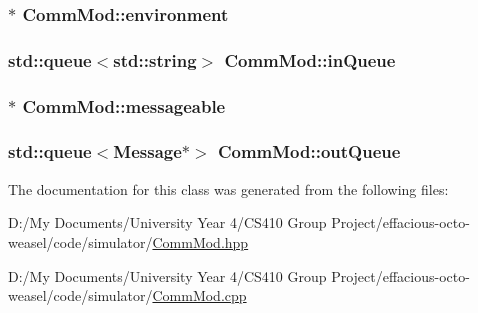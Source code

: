 \subsubsection[{\texorpdfstring{environment}{environment}}]{$\ast$ Comm\+Mod\+::environment\hspace{0.3cm}{\ttfamily [protected]}}\hypertarget{class_comm_mod_ae4953d3dd38bca7f71c309964636af91}{}\label{class_comm_mod_ae4953d3dd38bca7f71c309964636af91}
\subsubsection[{\texorpdfstring{in\+Queue}{inQueue}}]{\setlength{\rightskip}{0pt plus 5cm}std\+::queue$<$std\+::string$>$ Comm\+Mod\+::in\+Queue\hspace{0.3cm}{\ttfamily [protected]}}\hypertarget{class_comm_mod_a4d31d6d1741edaaf0ec840ff8bb30047}{}\label{class_comm_mod_a4d31d6d1741edaaf0ec840ff8bb30047}
\subsubsection[{\texorpdfstring{messageable}{messageable}}]{$\ast$ Comm\+Mod\+::messageable\hspace{0.3cm}{\ttfamily [protected]}}\hypertarget{class_comm_mod_ae45eb57f9d550eb7c0dbb9311a71f72e}{}\label{class_comm_mod_ae45eb57f9d550eb7c0dbb9311a71f72e}
\subsubsection[{\texorpdfstring{out\+Queue}{outQueue}}]{\setlength{\rightskip}{0pt plus 5cm}std\+::queue$<${\bf Message}$\ast$$>$ Comm\+Mod\+::out\+Queue\hspace{0.3cm}{\ttfamily [protected]}}\hypertarget{class_comm_mod_abbd4cbdbb8c4b8680a20aea400e2eabc}{}\label{class_comm_mod_abbd4cbdbb8c4b8680a20aea400e2eabc}


The documentation for this class was generated from the following files\+:\begin{DoxyCompactItemize}
\item 
D\+:/\+My Documents/\+University Year 4/\+C\+S410 Group Project/effacious-\/octo-\/weasel/code/simulator/\hyperlink{_comm_mod_8hpp}{Comm\+Mod.\+hpp}\item 
D\+:/\+My Documents/\+University Year 4/\+C\+S410 Group Project/effacious-\/octo-\/weasel/code/simulator/\hyperlink{_comm_mod_8cpp}{Comm\+Mod.\+cpp}\end{DoxyCompactItemize}

